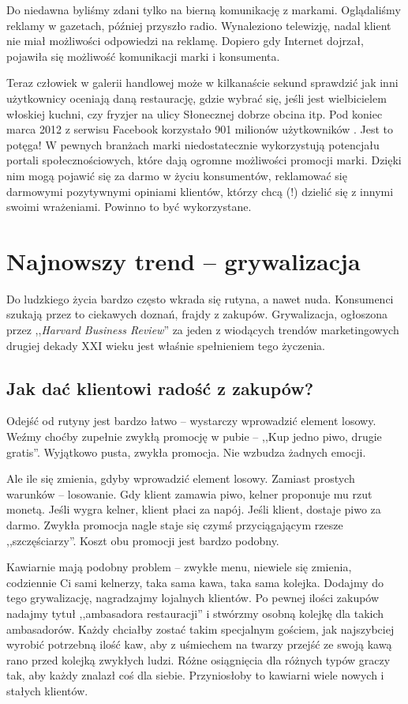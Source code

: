 \documentclass [a4paper, 11pt]{article}
\begin{document}
Do niedawna byliśmy zdani tylko na bierną komunikację z markami. Oglądaliśmy reklamy w gazetach, później przyszło radio. Wynaleziono telewizję, nadal klient nie miał możliwości odpowiedzi na reklamę. Dopiero gdy Internet dojrzał, pojawiła się możliwość komunikacji marki i konsumenta.

Teraz człowiek w galerii handlowej może w kilkanaście sekund sprawdzić jak inni użytkownicy oceniają daną restaurację, gdzie wybrać się, jeśli jest wielbicielem włoskiej kuchni, czy fryzjer na ulicy Słonecznej dobrze obcina itp. Pod koniec marca 2012 z serwisu Facebook korzystało 901 milionów użytkowników \cite{facebook}. Jest to potęga! W pewnych branżach marki niedostatecznie wykorzystują potencjału portali społecznościowych, które dają ogromne możliwości promocji marki. Dzięki nim mogą pojawić się za darmo w życiu konsumentów, reklamować się darmowymi pozytywnymi opiniami klientów, którzy chcą (!) dzielić się z innymi swoimi wrażeniami. Powinno to być wykorzystane.

\section{Najnowszy trend -- grywalizacja}
Do ludzkiego życia bardzo często wkrada się rutyna, a nawet nuda. Konsumenci szukają przez to ciekawych doznań, frajdy z zakupów. Grywalizacja, ogłoszona przez ,,\emph{Harvard Business Review}'' za jeden z wiodących trendów marketingowych drugiej dekady XXI wieku jest właśnie spełnieniem tego życzenia.\cite{tkaczykgrywalizacja}
\subsection{Jak dać klientowi radość z zakupów?}
Odejść od rutyny jest bardzo łatwo -- wystarczy wprowadzić element losowy. Weźmy choćby zupełnie zwykłą promocję w pubie -- ,,Kup jedno piwo, drugie gratis''. \cite{tkaczykwideo} Wyjątkowo pusta, zwykła promocja. Nie wzbudza żadnych emocji.

Ale ile się zmienia, gdyby wprowadzić element losowy. Zamiast prostych warunków -- losowanie. Gdy klient zamawia piwo, kelner proponuje mu rzut monetą. Jeśli wygra kelner, klient płaci za napój. Jeśli klient, dostaje piwo za darmo. Zwykła promocja nagle staje się czymś przyciągającym rzesze ,,szczęściarzy''. Koszt obu promocji jest bardzo podobny.

Kawiarnie mają podobny problem -- zwykłe menu, niewiele się zmienia, codziennie Ci sami kelnerzy, taka sama kawa, taka sama kolejka. Dodajmy do tego grywalizację, nagradzajmy lojalnych klientów. Po pewnej ilości zakupów nadajmy tytuł ,,ambasadora restauracji'' i stwórzmy osobną kolejkę dla takich ambasadorów. Każdy chciałby zostać takim specjalnym gościem, jak najszybciej wyrobić potrzebną ilość kaw, aby z uśmiechem na twarzy przejść ze swoją kawą rano przed kolejką zwykłych ludzi. Różne osiągnięcia dla różnych typów graczy tak, aby każdy znalazł coś dla siebie. Przyniosłoby to kawiarni wiele nowych i stałych klientów.
\end{document}
